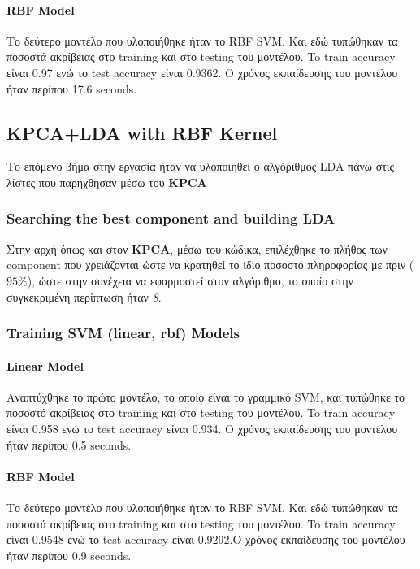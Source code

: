 \paragraph{RBF Model}

Το δεύτερο μοντέλο που υλοποιήθηκε ήταν το RBF SVM. Και εδώ τυπώθηκαν τα ποσοστά
ακρίβειας στο training και στο testing του μοντέλου. To train accuracy είναι 0.97 ενώ το test accuracy είναι 0.9362. Ο χρόνος εκπαίδευσης του μοντέλου ήταν περίπου 17.6 seconds.
\newpage

\subsection{KPCA+LDA with RBF Kernel}

Το επόμενο βήμα στην εργασία ήταν να υλοποιηθεί ο αλγόριθμος LDA πάνω στις λίστες που παρήχθησαν μέσω του \textbf{KPCA}
\subsubsection{Searching the best component  and building LDA  }

Στην αρχή όπως και στον \textbf{KPCA}, μέσω του κώδικα, επιλέχθηκε το πλήθος των component που χρειάζονται ώστε να κρατηθεί το ίδιο ποσοστό πληροφορίας με πριν ($95\%$), ώστε στην συνέχεια να εφαρμοστεί στον αλγόριθμο, το οποίο στην συγκεκριμένη περίπτωση ήταν \emph{8}.

\subsubsection{Training SVM (linear, rbf) Models}

\paragraph{Linear Model}

Αναπτύχθηκε το πρώτο μοντέλο, το οποίο είναι το γραμμικό SVM, και
τυπώθηκε το ποσοστό ακρίβειας στο training και στο testing του μοντέλου. To train accuracy είναι 0.958 ενώ το test
accuracy είναι 0.934. Ο χρόνος εκπαίδευσης του μοντέλου ήταν περίπου 0.5 seconds.

\paragraph{RBF Model}

Το δεύτερο μοντέλο που υλοποιήθηκε ήταν το RBF SVM. Και εδώ τυπώθηκαν τα ποσοστά
ακρίβειας στο training και στο testing του μοντέλου. To train accuracy είναι 0.9548 ενώ το test accuracy είναι 0.9292.Ο χρόνος εκπαίδευσης του μοντέλου ήταν περίπου 0.9 seconds.
\clearpage
